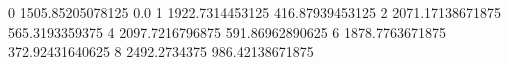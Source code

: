 0 1505.85205078125 0.0
1 1922.7314453125 416.87939453125
2 2071.17138671875 565.3193359375
4 2097.7216796875 591.86962890625
6 1878.7763671875 372.92431640625
8 2492.2734375 986.42138671875
